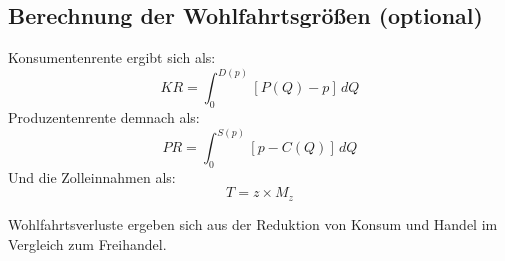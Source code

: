 \subsection{Berechnung der Wohlfahrtsgrößen (optional)}
Konsumentenrente ergibt sich als:
\[
KR = \int_0^{D(p)} \left[P(Q) - p \right] \, dQ
\]
Produzentenrente demnach als:
\[
PR = \int_0^{S(p)} \left[p - C(Q) \right] \, dQ
\]
Und die Zolleinnahmen als:
\[
T = z \times M_z
\]

Wohlfahrtsverluste ergeben sich aus der Reduktion von Konsum und Handel im Vergleich zum Freihandel.


